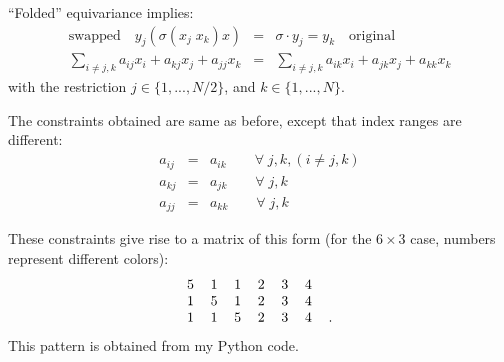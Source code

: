 ``Folded'' equivariance implies:
\begin{eqnarray}
\boxed{\mbox{swapped}} \quad y_j ( \sigma(x_j \; x_k) x) %
&=& \sigma \cdot y_j = y_k \quad \boxed{\mbox{original}} \\
\sum_{i \neq j,k} a_{ij} x_i + a_{kj} x_j + a_{jj} x_k &=& \sum_{i \neq j,k} a_{ik} x_i + a_{jk} x_j + a_{kk} x_k  \nonumber
\end{eqnarray}
with the restriction $j \in \{ 1,..., N/2 \}$, and $k \in \{ 1,..., N \}$.

The constraints obtained are same as before, except that index ranges are different:
\begin{eqnarray}
a_{ij} &=& a_{ik} \quad \quad \forall \;  j, k, (i \neq j, k) \nonumber \\
a_{kj} &=& a_{jk} \quad \quad \forall \;  j, k \nonumber \\
a_{jj} &=& a_{kk} \quad \quad \forall \;  j, k \nonumber
\end{eqnarray}

These constraints give rise to a matrix of this form (for the $6 \times 3$ case, numbers represent different colors):
\begin{equation}
\begin{tabular}{c c c c c c c}
5 & 1 & 1 & 2 & 3 & 4 & \\
1 & 5 & 1 & 2 & 3 & 4 & \\
1 & 1 & 5 & 2 & 3 & 4 & .
\end{tabular} 
\end{equation}This pattern is obtained from my Python code.

